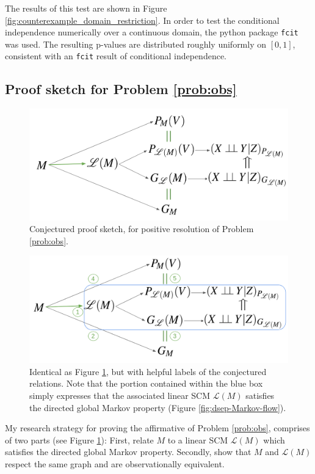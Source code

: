 \documentclass[letterpaper,10pt]{article}
\begin{document}
The results of this test are shown in Figure \ref{fig:counterexample_domain_restriction}. In order to test the conditional independence numerically over a continuous domain, the python package \verb|fcit| \cite{fcit} was used. The resulting p-values are distributed roughly uniformly on $[0,1]$, consistent with an \verb|fcit| result of conditional independence.
 
\subsection{Proof sketch for Problem \ref{prob:obs}}

\begin{figure}
\centering
\includegraphics[width=.5\linewidth]{pics/my_own/research_plan_flow.png}
\caption{Conjectured proof sketch, for positive resolution of Problem \ref{prob:obs}.}
\label{fig:research-plan-flow}
\end{figure}

\begin{figure}
\centering
\includegraphics[width=.5\linewidth]{pics/my_own/research_plan_numbered_boxed.png}
\caption{Identical as Figure \ref{fig:research-plan-flow}, but with helpful labels of the conjectured relations. Note that the portion contained within the blue box simply expresses that the associated linear SCM $\mathcal{L}(M)$ satisfies the directed global Markov property (Figure \ref{fig:dsep-Markov-flow}).}
\label{fig:research_plan_numbered_boxed}
\end{figure}

My research strategy for proving the affirmative of Problem \ref{prob:obs}, comprises of two parts (see Figure \ref{fig:research-plan-flow}): First, relate $M$ to a linear SCM $\mathcal{L}(M)$ which satisfies the directed global Markov property. Secondly, show that $M$ and $\mathcal{L}(M)$ respect the same graph and are observationally equivalent.
\end{document}
